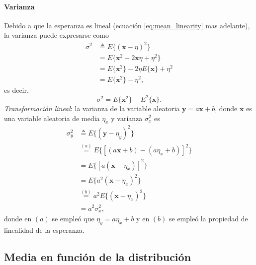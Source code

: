 \documentclass[a4paper]{report}
\newcommand{\x}{\mathbf{x}}
\newcommand{\y}{\mathbf{y}}
\begin{document}
\paragraph{Varianza} Debido a que la esperanza es lineal (ecuación \ref{eq:mean_linearity} mas adelante), la varianza puede expresarse como
\begin{align}\label{eq:variance_definition1}
 \sigma^2&\triangleq E\{(\x-\eta)^2\}\\
   &=E\{\x^2-2\x\eta+\eta^2\}\nonumber\\
   &=E\{\x^2\}-2\eta E\{\x\}+\eta^2\nonumber\\
   &=E\{\x^2\}-\eta^2,\nonumber
\end{align}
es decir,
\begin{equation}\label{eq:variance_definition2}
 \sigma^2=E\{\x^2\}-E^2\{\x\}.
\end{equation}
\emph{Transformación lineal}: la varianza de la variable aleatoria \(\y=a\x+b\), donde \(\x\) es una variable aleatoria de media \(\eta_x\) y varianza \(\sigma_x^2\) es
\begin{align}\label{eq:variance_linear_transform}
 \sigma_y^2&\triangleq E\{(\y-\eta_y)^2\}\nonumber\\
   &\overset{(a)}{=}E\{[(a\x+b)-(a\eta_x+b)]^2\}\nonumber\\
   &=E\{[a(\x-\eta_x)]^2\}\nonumber\\
   &=E\{a^2(\x-\eta_x)^2\}\nonumber\\
   &\overset{(b)}{=}a^2E\{(\x-\eta_x)^2\}\nonumber\\
   &=a^2\sigma_x^2,
\end{align}
donde en \((a)\) se empleó que \(\eta_y=a\eta_x+b\) y en \((b)\) se empleó la propiedad de linealidad de la esperanza.

\subsection{Media en función de la distribución}
\end{document}
